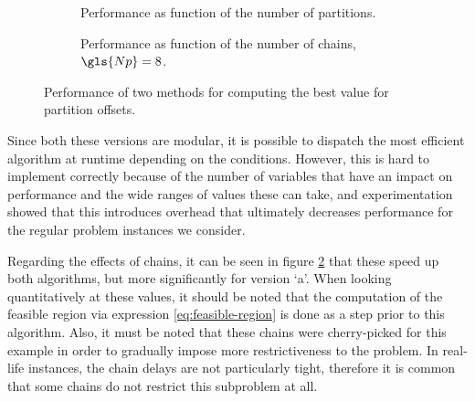 \documentclass[main.tex]{subfiles}
\begin{document}
\begin{figure}[htbp]
    \centering
    \begin{subfigure}{0.45\linewidth}
        \centering
        \resizebox{\linewidth}{!}{}
        \caption{Performance as function of the number of partitions.}
        \label{fig:by-partition}
    \end{subfigure}
    \hfill
    \begin{subfigure}{0.45\linewidth}
        \centering
        \resizebox{\linewidth}{!}{}
        \caption{Performance as function of the number of chains, $\gls{Np}=8$.}
        \label{fig:by-chain}
    \end{subfigure}
    \caption{Performance of two methods for computing the best value for partition offsets.}
    \label{fig:best-value-results}
\end{figure}

Since both these versions are modular, it is possible to dispatch the most efficient algorithm at runtime depending on the conditions.
However, this is hard to implement correctly because of the number of variables that have an impact on performance and the wide ranges of values these can take, and experimentation showed that this introduces overhead that ultimately decreases performance for the regular problem instances we consider.

Regarding the effects of chains, it can be seen in figure \ref{fig:by-chain} that these speed up both algorithms, but more significantly for version `a'.
When looking quantitatively at these values, it should be noted that the computation of the feasible region via expression \ref{eq:feasible-region} is done as a step prior to this algorithm.
Also, it must be noted that these chains were cherry-picked for this example in order to gradually impose more restrictiveness to the problem. 
In real-life instances, the chain delays are not particularly tight, therefore it is common that some chains do not restrict this subproblem at all.
\end{document}
